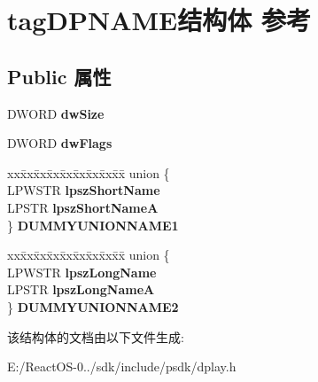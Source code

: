 \hypertarget{structtag_d_p_n_a_m_e}{}\section{tag\+D\+P\+N\+A\+M\+E结构体 参考}
\label{structtag_d_p_n_a_m_e}
\subsection*{Public 属性}
\begin{DoxyCompactItemize}
\item 
\mbox{\label{structtag_d_p_n_a_m_e_a176a5911889a226d916de3e2da814dca}} 
D\+W\+O\+RD {\bfseries dw\+Size}
\item 
\mbox{\label{structtag_d_p_n_a_m_e_aaf872554131c420e866b4a8b1748444b}} 
D\+W\+O\+RD {\bfseries dw\+Flags}
\item 
\mbox{\label{structtag_d_p_n_a_m_e_a55bf00f7985674cfcf155b97fc4f1b1e}} 
\begin{tabbing}
xx\=xx\=xx\=xx\=xx\=xx\=xx\=xx\=xx\=\kill
union \{\\
\>LPWSTR {\bfseries lpszShortName}\\
\>LPSTR {\bfseries lpszShortNameA}\\
\} {\bfseries DUMMYUNIONNAME1}\\

\end{tabbing}\item 
\mbox{\label{structtag_d_p_n_a_m_e_ac5757e04eede702a374ed5146a53b88b}} 
\begin{tabbing}
xx\=xx\=xx\=xx\=xx\=xx\=xx\=xx\=xx\=\kill
union \{\\
\>LPWSTR {\bfseries lpszLongName}\\
\>LPSTR {\bfseries lpszLongNameA}\\
\} {\bfseries DUMMYUNIONNAME2}\\

\end{tabbing}\end{DoxyCompactItemize}


该结构体的文档由以下文件生成\+:\begin{DoxyCompactItemize}
\item 
E\+:/\+React\+O\+S-\/0../sdk/include/psdk/dplay.\+h\end{DoxyCompactItemize}

